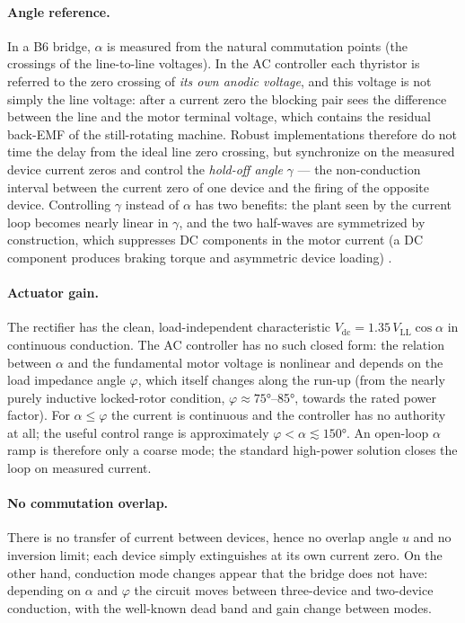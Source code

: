 \documentclass[11pt,a4paper]{article}
\begin{document}
\paragraph{Angle reference.} In a B6 bridge, $\alpha$ is measured from the
natural commutation points (the crossings of the line-to-line voltages). In
the AC controller each thyristor is referred to the zero crossing of
\emph{its own anodic voltage}, and this voltage is not simply the line
voltage: after a current zero the blocking pair sees the difference between
the line and the motor terminal voltage, which contains the residual
back-EMF of the still-rotating machine. Robust implementations therefore do
not time the delay from the ideal line zero crossing, but synchronize on the
measured device current zeros and control the \emph{hold-off angle}
$\gamma$ --- the non-conduction interval between the current zero of one
device and the firing of the opposite device. Controlling $\gamma$ instead
of $\alpha$ has two benefits: the plant seen by the current loop becomes
nearly linear in $\gamma$, and the two half-waves are symmetrized by
construction, which suppresses DC components in the motor current
(a DC component produces braking torque and asymmetric device loading)
\cite{zenginobuz}.

\paragraph{Actuator gain.} The rectifier has the clean, load-independent
characteristic $V_\mathrm{dc} = 1.35\,V_\mathrm{LL}\cos\alpha$ in continuous
conduction. The AC controller has no such closed form: the relation between
$\alpha$ and the fundamental motor voltage is nonlinear and depends on the
load impedance angle $\varphi$, which itself changes along the run-up (from
the nearly purely inductive locked-rotor condition, $\varphi \approx
\ang{75}$--\ang{85}, towards the rated power factor). For
$\alpha \le \varphi$ the current is continuous and the controller has no
authority at all; the useful control range is approximately
$\varphi < \alpha \lesssim \ang{150}$. An open-loop $\alpha$ ramp is
therefore only a coarse mode; the standard high-power solution closes the
loop on measured current.

\paragraph{No commutation overlap.} There is no transfer of current between
devices, hence no overlap angle $u$ and no inversion limit; each device
simply extinguishes at its own current zero. On the other hand, conduction
mode changes appear that the bridge does not have: depending on $\alpha$ and
$\varphi$ the circuit moves between three-device and two-device conduction,
with the well-known dead band and gain change between modes.
\end{document}

